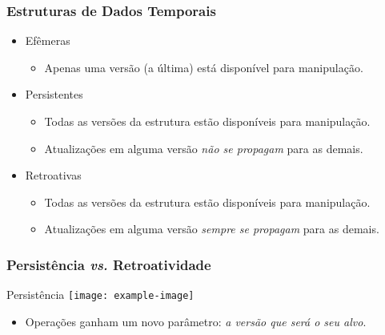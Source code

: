 \documentclass[brazil]{beamer}
\begin{document}
    \begin{frame}
        \frametitle{Estruturas de Dados Temporais}

        \begin{itemize}
            \item Efêmeras
            \begin{itemize}[<2->]
                \item Apenas uma versão (a última) está disponível para manipulação.
            \end{itemize}
            \item Persistentes
            \begin{itemize}[<3->]
                \item Todas as versões da estrutura estão disponíveis para manipulação.
                \item Atualizações em alguma versão {\em não se propagam} para as demais.
            \end{itemize}
            \item Retroativas
            \begin{itemize}[<4->]
                \item Todas as versões da estrutura estão disponíveis para manipulação.
                \item Atualizações em alguma versão {\em sempre se propagam} para as demais.
            \end{itemize}
        \end{itemize}
    \end{frame}

    \begin{frame}
        \frametitle{Persistência {\em vs.} Retroatividade}
        
        \begin{block}{Persistência}
            \centering
            \texttt{[image: example-image]}
        \end{block}
        
        \begin{itemize}
            \item Operações ganham um novo parâmetro: {\em a versão que será o seu alvo}.
        \end{itemize}

    \end{frame}
\end{document}
